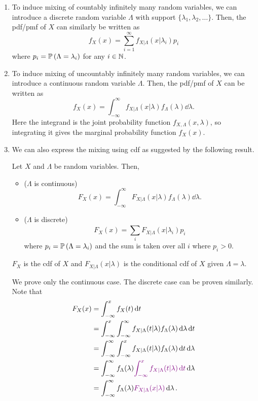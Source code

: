 \begin{enumerate}
\item \label{it:mixing-count-infinite}
To induce mixing of countably infinitely many random variables, we can
introduce a discrete random variable \(\Lambda\) with support
\(\{\lambda_1,\lambda_2,\dotsc\}\). Then, the pdf/pmf of \(X\) can similarly be
written as
\[
f_X(x)=\boxed{\sum_{i=1}^{\infty}f_{X|\Lambda}(x|\lambda_i)p_i}
\]
where \(p_i=\mathbb{P}\left(\Lambda=\lambda_i\right)\) for any \(i\in\mathbb{N}\).

\item \label{it:mixing-uncount-infinite}
To induce mixing of uncountably infinitely many random variables, we can
introduce a continuous random variable \(\Lambda\). Then, the pdf/pmf of \(X\)
can be written as
\[
f_X(x)=\boxed{\int_{-\infty}^{\infty}f_{X|\Lambda}(x|\lambda)f_{\Lambda}(\lambda)\dd{\lambda}}.
\]
Here the integrand is the joint probability function
\(f_{X,\Lambda}(x,\lambda)\), so integrating it gives the marginal probability
function \(f_X(x)\).

\item We can also express the mixing using cdf as suggested by the following
result.
\begin{proposition}
\label{prp:mixing-cdf}
Let \(X\) and \(\Lambda\) be random variables. Then,
\begin{itemize}
\item (\(\Lambda\) is continuous)
\[
F_X(x)=\int_{-\infty}^{\infty}F_{X|\Lambda}(x|\lambda)f_{\Lambda}(\lambda)\dd{\lambda}.
\]
\item (\(\Lambda\) is discrete)
\[
F_X(x)=\sum_{i}^{}F_{X|\Lambda}(x|\lambda_i)p_i
\]
where \(p_i=\mathbb{P}\left(\Lambda=\lambda_i\right)\) and the sum is taken over all \(i\)
where \(p_i>0\).
\end{itemize}
\begin{note}
\(F_X\) is the cdf of \(X\) and \(F_{X|\Lambda}(x|\lambda)\) is the conditional
cdf of \(X\) given \(\Lambda=\lambda\).
\end{note}
\end{proposition}
\begin{pf}
We prove only the continuous case. The discrete case can be proven similarly.
Note that
\begin{align*}
F_X(x)&=\int_{-\infty}^{x}f_X(t)\dd{t}\\
&=\int_{-\infty}^{x}\int_{-\infty}^{\infty}
f_{X|\Lambda}(t|\lambda)f_{\Lambda}(\lambda)\dd{\lambda}\dd{t}\\
&=\int_{-\infty}^{\infty}\int_{-\infty}^{x}
f_{X|\Lambda}(t|\lambda)f_{\Lambda}(\lambda)\dd{t}\dd{\lambda}\\
&=\int_{-\infty}^{\infty}f_{\Lambda}(\lambda){\color{violet}\int_{-\infty}^{x}
f_{X|\Lambda}(t|\lambda)\dd{t}}\dd{\lambda}\\
&=\int_{-\infty}^{\infty}f_{\Lambda}(\lambda){\color{violet}F_{X|\Lambda}(x|\lambda)}\dd{\lambda}.
\end{align*}

\end{pf}
\end{enumerate}

